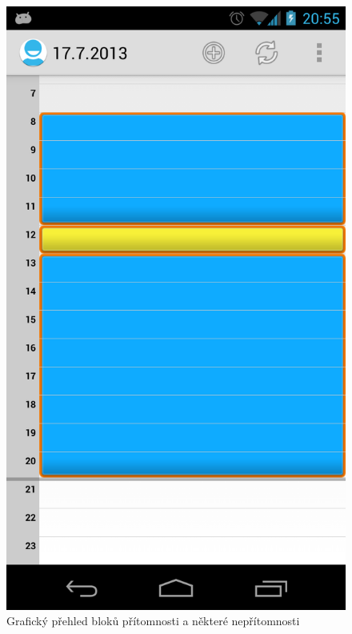 \documentclass{diplomka}
\begin{document}
\begin{figure}[H]
\begin{minipage}{.45\textwidth}
\centering
  \includegraphics[width=.9\linewidth]{scr/daytimeline.png}
  \caption{Grafický přehled bloků přítomnosti a některé nepřítomnosti}
  \label{fig:daytimeline}
\end{minipage}\hfill%
\begin{minipage}{.45\textwidth}
\centering

\end{minipage}
\end{figure}
\end{document}
